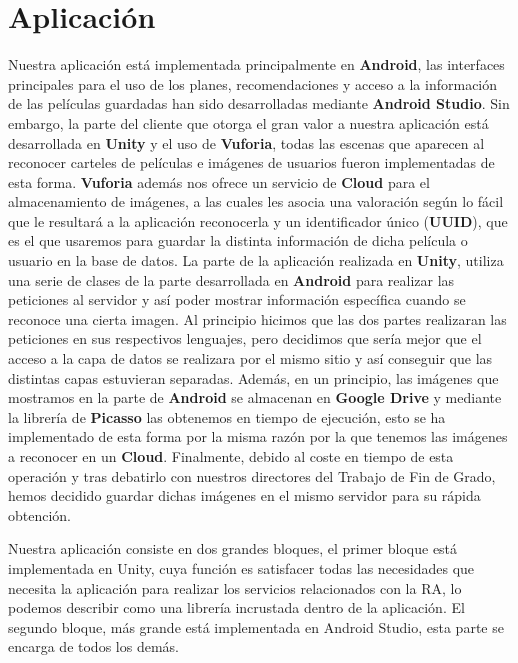 \section{Aplicación}
\label{makereference4.3}
Nuestra aplicación está implementada principalmente en \textbf{Android}, las interfaces principales para el uso de los planes, recomendaciones y acceso a la información de las películas guardadas han sido desarrolladas mediante \textbf{Android Studio}. Sin embargo,
la parte del cliente que otorga el gran valor a nuestra aplicación está desarrollada en \textbf{Unity} y el uso de \textbf{Vuforia}, todas las escenas que aparecen al reconocer carteles de películas e imágenes de usuarios fueron implementadas de esta forma. \textbf{Vuforia} además nos ofrece un
servicio de \textbf{Cloud} para el almacenamiento de imágenes, a las cuales les asocia una valoración según lo fácil que le resultará a la aplicación reconocerla y un identificador único (\textbf{UUID}), que es el que usaremos para guardar la distinta información de dicha película o usuario en la base de datos.
La parte de la aplicación realizada en \textbf{Unity}, utiliza una serie de clases de la parte desarrollada en \textbf{Android} para realizar las peticiones al servidor y así poder mostrar información específica cuando se reconoce una cierta imagen.
Al principio hicimos que las dos partes realizaran las peticiones en sus respectivos lenguajes, pero decidimos que sería mejor que el acceso a la capa de datos se realizara por el mismo sitio y así conseguir que las distintas capas estuvieran separadas.
Además, en un principio, las imágenes que mostramos en la parte de \textbf{Android} se almacenan en \textbf{Google Drive} y mediante la librería de \textbf{Picasso} las obtenemos en tiempo de ejecución, esto se ha implementado de esta forma por la misma razón por la que tenemos las imágenes a reconocer en un \textbf{Cloud}.
Finalmente, debido al coste en tiempo de esta operación y tras debatirlo con nuestros directores del Trabajo de Fin de Grado, hemos decidido guardar dichas imágenes en el mismo servidor para su rápida obtención.

Nuestra aplicación consiste en dos grandes bloques, el primer bloque está implementada en Unity, cuya función es satisfacer todas las necesidades que necesita la aplicación para realizar los servicios relacionados con la RA, lo podemos describir como una librería incrustada dentro de la aplicación. El 
segundo bloque, más grande está implementada en Android Studio, esta parte se encarga de todos los demás. 


